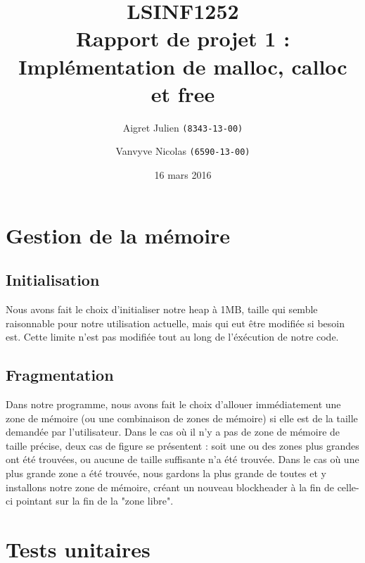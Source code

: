 \documentclass[10pt,a4paper]{article}
\author{Aigret Julien \texttt{(8343-13-00)}\and Vanvyve Nicolas \texttt{(6590-13-00)}}
\date{16 mars 2016}
\title{LSINF1252\\Rapport de projet 1 :\\Implémentation de malloc, calloc et free}
\begin{document}
\maketitle

\section{Gestion de la mémoire}
\subsection{Initialisation}
Nous avons fait le choix d'initialiser notre heap à 1MB, taille qui semble raisonnable pour notre utilisation actuelle, mais qui eut être modifiée si besoin est. Cette limite n'est pas modifiée tout au long de l'éxécution de notre code.

\subsection{Fragmentation}
Dans notre programme, nous avons fait le choix d'allouer immédiatement une zone de mémoire (ou une combinaison de zones de mémoire) si elle est de la taille demandée par l'utilisateur. Dans le cas où il n'y a pas de zone de mémoire de taille précise, deux cas de figure se présentent : soit une ou des zones plus grandes ont été trouvées, ou aucune de taille suffisante n'a été trouvée. Dans le cas où une plus grande zone a été trouvée, nous gardons la plus grande de toutes et y installons notre zone de mémoire, créant un nouveau blockheader à la fin de celle-ci pointant sur la fin de la "zone libre".


\section{Tests unitaires}
\end{document}
